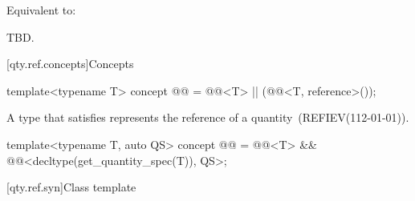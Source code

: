\begin{itemdescr}
\pnum
\effects
Equivalent to:
\begin{codeblock}
TBD.
\end{codeblock}
\end{itemdescr}

[qty.ref.concepts]{Concepts}

\begin{itemdecl}
template<typename T>
concept @@ = @@<T> || (@@<T, reference>());
\end{itemdecl}

A type  that satisfies 
represents the reference of a quantity~(REFIEV(112-01-01)).

\begin{itemdecl}
template<typename T, auto QS>
concept @@ = @@<T> && @@<decltype(get_quantity_spec(T{})), QS>;
\end{itemdecl}

[qty.ref.syn]{Class template }

